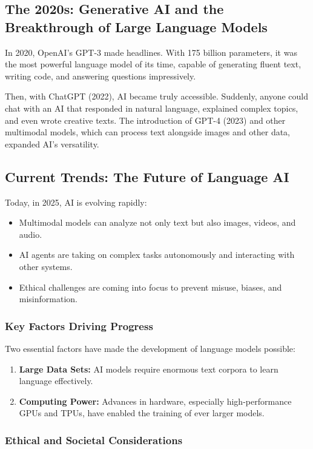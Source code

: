 \subsection{The 2020s: Generative AI and the Breakthrough of Large Language Models}

In 2020, OpenAI’s GPT-3 made headlines. With 175 billion parameters, it was the most
powerful language model of its time, capable of generating fluent text, writing code,
and answering questions impressively.

Then, with ChatGPT (2022), AI became truly accessible. Suddenly, anyone could chat
with an AI that responded in natural language, explained complex topics, and even
wrote creative texts. The introduction of GPT-4 (2023) and other multimodal models,
which can process text alongside images and other data, expanded AI’s versatility.

\subsection{Current Trends: The Future of Language AI}

Today, in 2025, AI is evolving rapidly:
\begin{itemize}
  \item Multimodal models can analyze not only text but also images, videos, and audio.
  \item AI agents are taking on complex tasks autonomously and interacting with other
        systems.
  \item Ethical challenges are coming into focus to prevent misuse, biases, and
        misinformation.
\end{itemize}

\subsubsection{Key Factors Driving Progress}

Two essential factors have made the development of language models possible:
\begin{enumerate}
  \item \textbf{Large Data Sets:} AI models require enormous text corpora to learn
        language effectively.
  \item \textbf{Computing Power:} Advances in hardware, especially high-performance GPUs
        and TPUs, have enabled the training of ever larger models.
\end{enumerate}

\subsubsection{Ethical and Societal Considerations}

